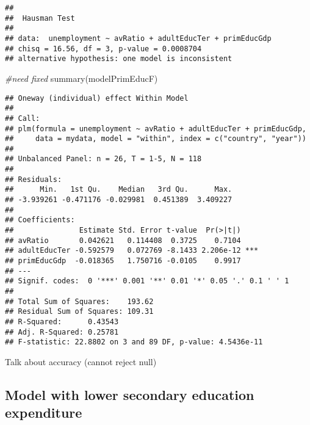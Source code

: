 \documentclass[
]{article}
\newenvironment{Shaded}{\begin{snugshade}}{\end{snugshade}}
\newcommand{\CommentTok}[1]{\textcolor[rgb]{0.56,0.35,0.01}{\textit{#1}}}
\newcommand{\FunctionTok}[1]{\textcolor[rgb]{0.00,0.00,0.00}{#1}}
\newcommand{\NormalTok}[1]{#1}
\begin{document}
\begin{verbatim}
## 
##  Hausman Test
## 
## data:  unemployment ~ avRatio + adultEducTer + primEducGdp
## chisq = 16.56, df = 3, p-value = 0.0008704
## alternative hypothesis: one model is inconsistent
\end{verbatim}

\begin{Shaded}
\begin{Highlighting}[]
\CommentTok{\#need fixed}
\FunctionTok{summary}\NormalTok{(modelPrimEducF)}
\end{Highlighting}
\end{Shaded}

\begin{verbatim}
## Oneway (individual) effect Within Model
## 
## Call:
## plm(formula = unemployment ~ avRatio + adultEducTer + primEducGdp, 
##     data = mydata, model = "within", index = c("country", "year"))
## 
## Unbalanced Panel: n = 26, T = 1-5, N = 118
## 
## Residuals:
##      Min.   1st Qu.    Median   3rd Qu.      Max. 
## -3.939261 -0.471176 -0.029981  0.451389  3.409227 
## 
## Coefficients:
##               Estimate Std. Error t-value  Pr(>|t|)    
## avRatio       0.042621   0.114408  0.3725    0.7104    
## adultEducTer -0.592579   0.072769 -8.1433 2.206e-12 ***
## primEducGdp  -0.018365   1.750716 -0.0105    0.9917    
## ---
## Signif. codes:  0 '***' 0.001 '**' 0.01 '*' 0.05 '.' 0.1 ' ' 1
## 
## Total Sum of Squares:    193.62
## Residual Sum of Squares: 109.31
## R-Squared:      0.43543
## Adj. R-Squared: 0.25781
## F-statistic: 22.8802 on 3 and 89 DF, p-value: 4.5436e-11
\end{verbatim}

Talk about accuracy (cannot reject null)

\hypertarget{model-with-lower-secondary-education-expenditure}{%
\subsection{Model with lower secondary education
expenditure}\label{model-with-lower-secondary-education-expenditure}}
\end{document}
